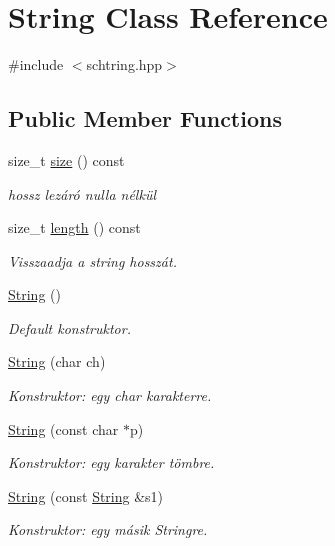 \hypertarget{class_string}{}\section{String Class Reference}
\label{class_string}


{\ttfamily \#include $<$schtring.\+hpp$>$}

\subsection*{Public Member Functions}
\begin{DoxyCompactItemize}
\item 
size\+\_\+t \mbox{\hyperlink{class_string_a588c5cc9faededbb9d938662d354feed}{size}} () const
\begin{DoxyCompactList}\small\item\em hossz lezáró nulla nélkül \end{DoxyCompactList}\item 
size\+\_\+t \mbox{\hyperlink{class_string_ad3b888edbfb3bab21d4bae4663d2211a}{length}} () const
\begin{DoxyCompactList}\small\item\em Visszaadja a string hosszát. \end{DoxyCompactList}\item 
\mbox{\hyperlink{class_string_a8a7ef356e05eb9b1ea1ab518baee3095}{String}} ()
\begin{DoxyCompactList}\small\item\em Default konstruktor. \end{DoxyCompactList}\item 
\mbox{\hyperlink{class_string_a62a77180f8df2547e8be1313654abcee}{String}} (char ch)
\begin{DoxyCompactList}\small\item\em Konstruktor\+: egy char karakterre. \end{DoxyCompactList}\item 
\mbox{\hyperlink{class_string_a09ca4f1436a83ecb1c273a836b7cd4c6}{String}} (const char $\ast$p)
\begin{DoxyCompactList}\small\item\em Konstruktor\+: egy karakter tömbre. \end{DoxyCompactList}\item 
\mbox{\hyperlink{class_string_a3c682dc983b45bdbb7f3858fe4cbf221}{String}} (const \mbox{\hyperlink{class_string}{String}} \&s1)
\begin{DoxyCompactList}\small\item\em Konstruktor\+: egy másik Stringre. \end{DoxyCompactList}\item 

\end{DoxyCompactItemize}
